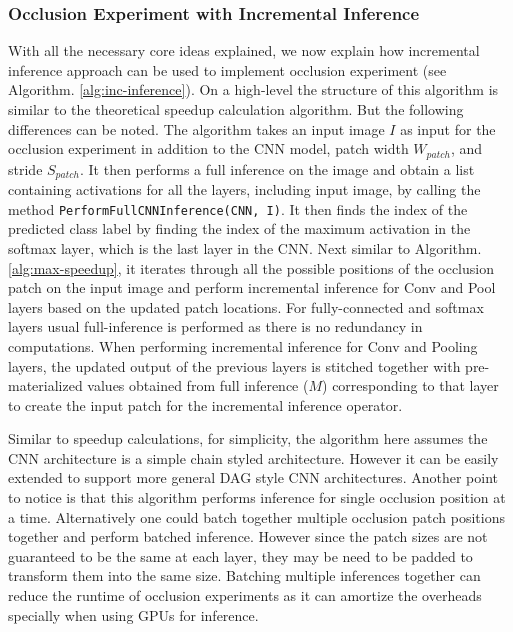 \documentclass[10, sigconf]{acmart}
\begin{document}
\subsubsection{Occlusion Experiment with Incremental Inference}
With all the necessary core ideas explained, we now explain how incremental inference approach can be used to implement occlusion experiment (see Algorithm. \ref{alg:inc-inference}).
On a high-level the structure of this algorithm is similar to the theoretical speedup calculation algorithm. But the following differences can be noted. The algorithm takes an input image $I$ as input for the occlusion experiment in addition to the CNN model, patch width $W_{patch}$, and stride $S_{patch}$.
It then performs a full inference on the image and obtain a list containing activations for all the layers, including input image, by calling the method \texttt{PerformFullCNNInference(CNN, I)}.
It then finds the index of the predicted class label by finding the index of the maximum activation in the softmax layer, which is the last layer in the CNN.
Next similar to Algorithm. \ref{alg:max-speedup}, it iterates through all the possible positions of the occlusion patch on the input image and perform incremental inference for Conv and Pool layers based on the updated patch locations. For fully-connected and softmax layers usual full-inference is performed as there is no redundancy in computations.
When performing incremental inference for Conv and Pooling layers, the updated output of the previous layers is stitched together with pre-materialized values obtained from full inference ($M$) corresponding to that layer to create the input patch for the incremental inference operator.

Similar to speedup calculations, for simplicity, the algorithm here assumes the CNN architecture is a simple chain styled architecture. However it can be easily extended to support more general DAG style CNN architectures.
Another point to notice is that this algorithm performs inference for single occlusion position at a time. Alternatively one could batch together multiple occlusion patch positions together and perform batched inference. However since the patch sizes are not guaranteed to be the same at each layer, they may be need to be padded to transform them into the same size.
Batching multiple inferences together can reduce the runtime of occlusion experiments as it can amortize the overheads specially when using GPUs for inference.
\end{document}
